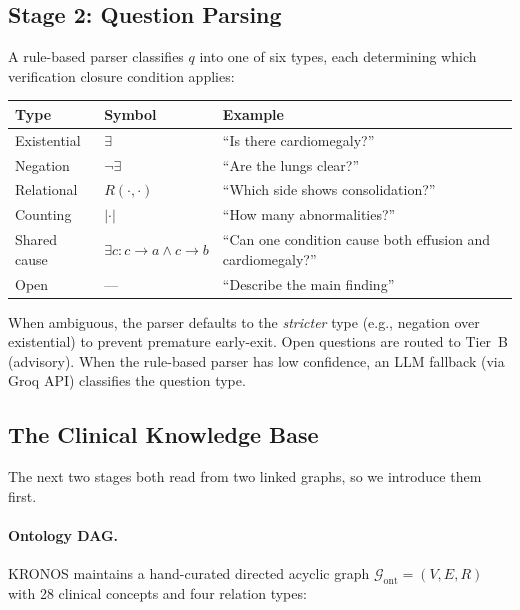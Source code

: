\documentclass[runningheads]{llncs}
\begin{document}

\subsection{Stage 2: Question Parsing}

A rule-based parser classifies $q$ into one of six types, each
determining which verification closure condition applies:

\begin{center}
\small
\begin{tabular}{llp{3.3cm}}
\toprule
\textbf{Type} & \textbf{Symbol} & \textbf{Example} \\
\midrule
Existential    & $\exists$          & ``Is there cardiomegaly?'' \\
Negation       & $\neg\exists$      & ``Are the lungs clear?'' \\
Relational     & $R(\cdot,\cdot)$   & ``Which side shows consolidation?'' \\
Counting       & $|\cdot|$          & ``How many abnormalities?'' \\
Shared cause   & $\exists c: c \!\to\! a \wedge c \!\to\! b$
                                    & ``Can one condition cause both
                                      effusion and cardiomegaly?'' \\
Open           & ---                & ``Describe the main finding'' \\
\bottomrule
\end{tabular}
\end{center}

\noindent
When ambiguous, the parser defaults to the \emph{stricter} type
(e.g., negation over existential) to prevent premature early-exit.
Open questions are routed to Tier~B (advisory).
When the rule-based parser has low confidence, an LLM fallback
(via Groq API) classifies the question type.


\subsection{The Clinical Knowledge Base}
\label{sec:knowledge_base}

The next two stages both read from two linked graphs, so we introduce them
first.

\paragraph{Ontology DAG.}
KRONOS maintains a hand-curated directed acyclic graph
$\mathcal{G}_{\text{ont}} = (V, E, R)$ with 28 clinical concepts and four
relation types:
\end{document}
